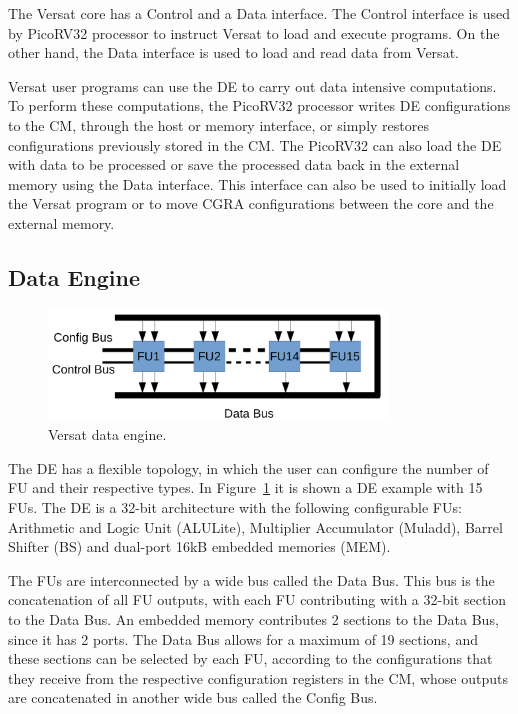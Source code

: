 The Versat core has a Control and a Data interface. The Control interface is
used by PicoRV32 processor to instruct Versat to load and execute programs. On
the other hand, the Data interface is used to load and read data from Versat.

Versat user programs can use the \ac{DE} to carry out data intensive computations. To
perform these computations, the PicoRV32 processor writes \ac{DE} configurations to
the \ac{CM}, through the host or memory interface, or simply restores
configurations previously stored in the \ac{CM}. The PicoRV32 can also load the
\ac{DE} with data to be processed or save the processed data back in the
external memory using the Data interface. This interface can also be used to
initially load the Versat program or to move \ac{CGRA} configurations between
the core and the external memory.


\subsection{Data Engine}
\label{subsection:data}

\begin{figure}[!htb]
	\centering
	\includegraphics[width=0.8\textwidth]{Figures/de.png}
	\caption{Versat data engine.}
	\label{fig:de}
\end{figure}

The \ac{DE} has a flexible topology, in which the user can configure the number
of \ac{FU} and their respective types. In Figure~\ref{fig:de} it is shown a
\ac{DE} example with 15 \ac{FU}s. The \ac{DE} is a 32-bit architecture with the
following configurable \ac{FU}s: Arithmetic and Logic Unit (ALULite),
Multiplier Accumulator (Muladd), Barrel Shifter (BS) and dual-port 16kB embedded
memories (MEM).

The \ac{FU}s are interconnected by a wide bus called the Data Bus. This bus is
the concatenation of all \ac{FU} outputs, with each FU contributing with a
32-bit section to the Data Bus. An embedded memory contributes 2 sections to the
Data Bus, since it has 2 ports. The Data Bus allows for a maximum of 19
sections, and these sections can be selected by each FU, according to the
configurations that they receive from the respective configuration registers in
the \ac{CM}, whose outputs are concatenated in another wide bus called the
Config Bus.

